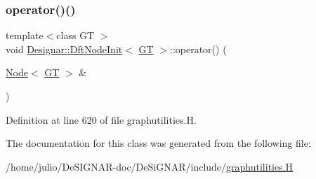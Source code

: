 \subsubsection{\texorpdfstring{operator()()}{operator()()}}
{\footnotesize\ttfamily template$<$class GT $>$ \\
void \hyperlink{class_designar_1_1_dft_node_init}{Designar\+::\+Dft\+Node\+Init}$<$ \hyperlink{demo-buildgraph_8_c_a3001c40d2c31ca87ed96cd7d1334a55e}{GT} $>$\+::operator() (\begin{DoxyParamCaption}\item[{\hyperlink{namespace_designar_a5af326c65aa2bd26b26c410f2030d09e}{Node}$<$ \hyperlink{demo-buildgraph_8_c_a3001c40d2c31ca87ed96cd7d1334a55e}{GT} $>$ \&}]{ }\end{DoxyParamCaption})\hspace{0.3cm}{\ttfamily [inline]}}



Definition at line 620 of file graphutilities.\+H.



The documentation for this class was generated from the following file\+:\begin{DoxyCompactItemize}
\item 
/home/julio/\+De\+S\+I\+G\+N\+A\+R-\/doc/\+De\+Si\+G\+N\+A\+R/include/\hyperlink{graphutilities_8_h}{graphutilities.\+H}\end{DoxyCompactItemize}
